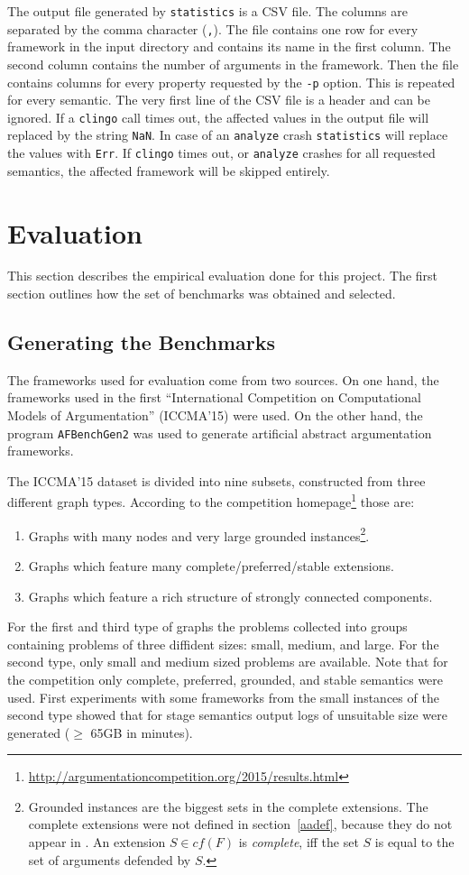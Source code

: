 \documentclass[parskip=half]{scrartcl}
\begin{document}
The output file generated by \texttt{statistics} is a CSV file. The columns are
separated by the comma character (\texttt{,}). The file contains one row for
every framework in the input directory and contains its name in the first
column. The second column contains the number of arguments in the framework.
Then the file contains columns for every property requested by the \texttt{-p}
option. This is repeated for every semantic. The very first line of the CSV file
is a header and can be ignored. If a \texttt{clingo} call times out, the
affected values in the output file will replaced by the string \texttt{NaN}. In
case of an \texttt{analyze} crash \texttt{statistics} will replace the values
with \texttt{Err}. If \texttt{clingo} times out, or \texttt{analyze} crashes
for all requested semantics, the affected framework will be skipped entirely.

\section{Evaluation}
\label{evaluation}
This section describes the empirical evaluation done for this project.
The first section outlines how the set of benchmarks was obtained and selected.

\subsection{Generating the Benchmarks}
\label{gen_bench}
The frameworks used for evaluation come from two sources. On one hand, the
frameworks used in the first ``International Competition on Computational Models
of Argumentation'' (ICCMA'15) were used. On the other hand, the program
\texttt{AFBenchGen2} was used to generate artificial abstract argumentation
frameworks.

The ICCMA'15 dataset is divided into nine subsets, constructed from three
different graph types. According to the competition
homepage\footnote{\url{http://argumentationcompetition.org/2015/results.html}}
those are:
\begin{enumerate}
  \item Graphs with many nodes and very large grounded instances\footnote{
  Grounded instances are the biggest sets in the complete extensions. The complete
  extensions were not defined in section~\ref{aadef}, because they do not appear
  in \cite{baumann2016}. An extension $S\in cf(F)$ is \emph{complete}, iff
  the set $S$ is equal to the set of arguments defended by $S$.}.
  \item Graphs which feature many complete/preferred/stable extensions.
  \item Graphs which feature a rich structure of strongly connected components.
\end{enumerate}
For the first and third type of graphs the problems collected into groups
containing problems of three diffident sizes: small, medium, and large. For the
second type, only small and medium sized problems are available. Note that for
the competition only complete, preferred, grounded, and stable semantics were
used. First experiments with some frameworks from the small instances of the
second type showed that for stage semantics output logs of unsuitable size were
generated ($\geq$ 65GB in minutes).
\end{document}

